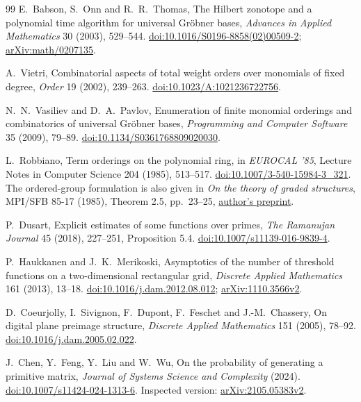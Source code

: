 \documentclass[11pt,a4paper]{article}
\theoremstyle{remark}
\begin{document}
\begin{thebibliography}{99}
E.~Babson, S.~Onn and R.~R.~Thomas,
The Hilbert zonotope and a polynomial time algorithm for universal Gr\"obner bases,
\emph{Advances in Applied Mathematics} 30 (2003), 529--544.
\href{https://doi.org/10.1016/S0196-8858(02)00509-2}{doi:10.1016/S0196-8858(02)00509-2};
\href{https://arxiv.org/abs/math/0207135}{arXiv:math/0207135}.

A.~Vietri,
Combinatorial aspects of total weight orders over monomials of fixed degree,
\emph{Order} 19 (2002), 239--263.
\href{https://doi.org/10.1023/A:1021236722756}{doi:10.1023/A:1021236722756}.

N.~N.~Vasiliev and D.~A.~Pavlov,
Enumeration of finite monomial orderings and combinatorics of
universal Gr\"obner bases,
\emph{Programming and Computer Software} 35 (2009), 79--89.
\href{https://doi.org/10.1134/S0361768809020030}{doi:10.1134/S0361768809020030}.

L.~Robbiano,
Term orderings on the polynomial ring,
in \emph{EUROCAL '85}, Lecture Notes in Computer Science 204
(1985), 513--517.
\href{https://doi.org/10.1007/3-540-15984-3_321}{doi:10.1007/3-540-15984-3\_321}.
The ordered-group formulation is also given in
\emph{On the theory of graded structures}, MPI/SFB 85-17 (1985),
Theorem 2.5, pp.~23--25,
\href{https://archive.mpim-bonn.mpg.de/2939/1/preprint_1985_17.pdf}{author's preprint}.

P.~Dusart,
Explicit estimates of some functions over primes,
\emph{The Ramanujan Journal} 45 (2018), 227--251,
Proposition 5.4.
\href{https://doi.org/10.1007/s11139-016-9839-4}{doi:10.1007/s11139-016-9839-4}.

P.~Haukkanen and J.~K.~Merikoski,
Asymptotics of the number of threshold functions on a two-dimensional
rectangular grid,
\emph{Discrete Applied Mathematics} 161 (2013), 13--18.
\href{https://doi.org/10.1016/j.dam.2012.08.012}{doi:10.1016/j.dam.2012.08.012};
\href{https://arxiv.org/abs/1110.3566v2}{arXiv:1110.3566v2}.

D.~Coeurjolly, I.~Sivignon, F.~Dupont, F.~Feschet and J.-M.~Chassery,
On digital plane preimage structure,
\emph{Discrete Applied Mathematics} 151 (2005), 78--92.
\href{https://doi.org/10.1016/j.dam.2005.02.022}{doi:10.1016/j.dam.2005.02.022}.

J.~Chen, Y.~Feng, Y.~Liu and W.~Wu,
On the probability of generating a primitive matrix,
\emph{Journal of Systems Science and Complexity} (2024).
\href{https://doi.org/10.1007/s11424-024-1313-6}{doi:10.1007/s11424-024-1313-6}.
Inspected version:
\href{https://arxiv.org/abs/2105.05383v2}{arXiv:2105.05383v2}.


\end{thebibliography}
\end{document}

